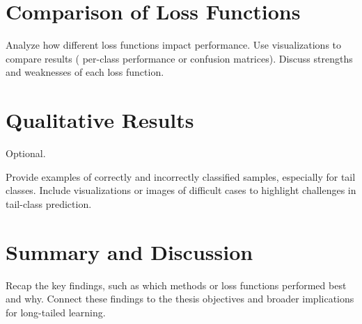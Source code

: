 \section{Comparison of Loss Functions}
Analyze how different loss functions impact performance.
Use visualizations to compare results ( per-class performance or confusion matrices).
Discuss strengths and weaknesses of each loss function.

\section{Qualitative Results}
Optional.

Provide examples of correctly and incorrectly classified samples, especially for tail classes.
Include visualizations or images of difficult cases to highlight challenges in tail-class prediction.



\section{Summary and Discussion}
Recap the key findings, such as which methods or loss functions performed best and why.
Connect these findings to the thesis objectives and broader implications for long-tailed learning.
